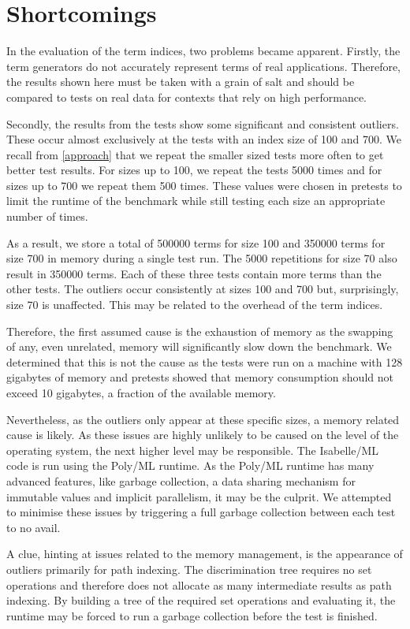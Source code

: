 \section{Shortcomings} \label{shortcomings}
In the evaluation of the term indices, two problems became apparent. Firstly, the term generators do not accurately represent terms of real applications. Therefore, the results shown here must be taken with a grain of salt and should be compared to tests on real data for contexts that rely on high performance.

Secondly, the results from the tests show some significant and consistent outliers. These occur almost exclusively at the tests with an index size of 100 and 700. We recall from \cref{approach} that we repeat the smaller sized tests more often to get better test results. For sizes up to 100, we repeat the tests 5000 times and for sizes up to 700 we repeat them 500 times. These values were chosen in pretests to limit the runtime of the benchmark while still testing each size an appropriate number of times.

As a result, we store a total of 500000 terms for size 100 and 350000 terms for size 700 in memory during a single test run. The 5000 repetitions for size 70 also result in 350000 terms.
Each of these three tests contain more terms than the other tests.
The outliers occur consistently at sizes 100 and 700 but, surprisingly, size 70 is unaffected. This may be related to the overhead of the term indices.

Therefore, the first assumed cause is the exhaustion of memory as the swapping of any, even unrelated, memory will significantly slow down the benchmark. We determined that this is not the cause as the tests were run on a machine with 128 gigabytes of memory and pretests showed that memory consumption should not exceed 10 gigabytes, a fraction of the available memory.

Nevertheless, as the outliers only appear at these specific sizes, a memory related cause is likely. As these issues are highly unlikely to be caused on the level of the operating system, the next higher level may be responsible. The Isabelle/ML code is run using the Poly/ML runtime. As the Poly/ML runtime has many advanced features, like garbage collection, a data sharing mechanism for immutable values and implicit parallelism, it may be the culprit. We attempted to minimise these issues by triggering a full garbage collection between each test to no avail.

A clue, hinting at issues related to the memory management, is the appearance of outliers primarily for path indexing. The discrimination tree requires no set operations and therefore does not allocate as many intermediate results as path indexing. By building a tree of the required set operations and evaluating it, the runtime may be forced to run a garbage collection before the test is finished.

